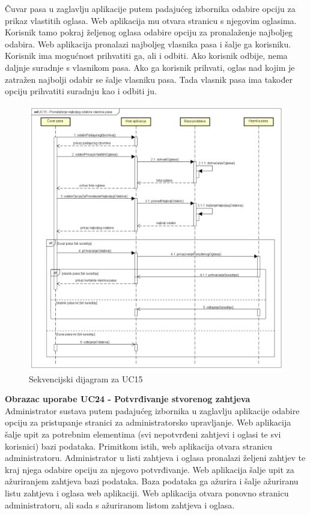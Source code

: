 				Čuvar pasa u zaglavlju aplikacije putem padajućeg izbornika odabire opciju za prikaz vlastitih oglasa. Web aplikacija mu otvara stranicu s njegovim oglasima. Korisnik tamo pokraj željenog oglasa odabire opciju za pronalaženje najboljeg odabira. Web aplikacija pronalazi najboljeg vlasnika pasa i šalje ga korisniku. Korisnik ima mogućnost prihvatiti ga, ali i odbiti. Ako korisnik odbije, nema daljnje suradnje s vlasnikom pasa. Ako ga korisnik prihvati, oglas nad kojim je zatražen najbolji odabir se šalje vlasniku pasa. Tada vlasnik pasa ima također opciju prihvatiti suradnju kao i odbiti ju.
				
				\begin{figure}[htb]
					\centering
					\includegraphics[width=14cm]{slike/Sekvencijski dijagram - UC15}
					\caption{Sekvencijski dijagram za UC15}
					\label{fig:Sekvencijski-UC15}
				\end{figure}
				\eject		
				
				\textbf{Obrazac uporabe UC24 - Potvrđivanje stvorenog zahtjeva}\\
				
				Administrator sustava putem padajućeg izbornika u zaglavlju aplikacije odabire opciju za pristupanje stranici za administratorsko upravljanje. Web aplikacija šalje upit za potrebnim elementima (svi nepotvrđeni zahtjevi i oglasi te svi korisnici) bazi podataka. Primitkom istih, web aplikacija otvara stranicu administratoru. Administrator u listi zahtjeva i oglasa pronalazi željeni zahtjev te kraj njega odabire opciju za njegovo potvrđivanje. Web aplikacija šalje upit za ažuriranjem zahtjeva bazi podataka. Baza podataka ga ažurira i šalje ažuriranu listu zahtjeva i oglasa web aplikaciji. Web aplikacija otvara ponovno stranicu administratoru, ali sada s ažuriranom listom zahtjeva i oglasa.
				
